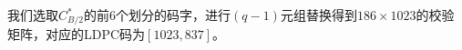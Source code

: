 \documentclass[lang=cn,11pt,a4paper,numbers]{elegantpaper}
\begin{document}
我们选取$C_{B/2}^{*}$的前6个划分的码字，进行$(q-1)$元组替换得到$186\times 1023$的校验矩阵，对应的LDPC码为$[1023, 837]$。
\end{document}
